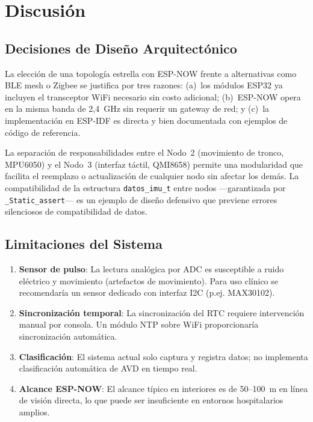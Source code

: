 \documentclass[10pt,twocolumn,a4paper]{article}
\begin{document}
\section{Discusión}
\label{sec:disc}

\subsection{Decisiones de Diseño Arquitectónico}

La elección de una topología estrella con ESP-NOW frente a alternativas
como BLE mesh o Zigbee se justifica por tres razones: (a)~los módulos
ESP32 ya incluyen el transceptor WiFi necesario sin costo adicional;
(b)~ESP-NOW opera en la misma banda de 2,4~GHz sin requerir un gateway
de red; y (c)~la implementación en ESP-IDF es directa y bien documentada
con ejemplos de código de referencia.

La separación de responsabilidades entre el Nodo~2 (movimiento de
tronco, MPU6050) y el Nodo~3 (interfaz táctil, QMI8658) permite una
modularidad que facilita el reemplazo o actualización de cualquier nodo
sin afectar los demás. La compatibilidad de la estructura
\texttt{datos\_imu\_t} entre nodos —garantizada por
\texttt{\_Static\_assert}— es un ejemplo de diseño defensivo que
previene errores silenciosos de compatibilidad de datos.

\subsection{Limitaciones del Sistema}

\begin{enumerate}
  \item \textbf{Sensor de pulso}: La lectura analógica por ADC es
        susceptible a ruido eléctrico y movimiento (artefactos de
        movimiento). Para uso clínico se recomendaría un sensor
        dedicado con interfaz I2C (p.ej. MAX30102).
  \item \textbf{Sincronización temporal}: La sincronización del RTC
        requiere intervención manual por consola. Un módulo NTP sobre
        WiFi proporcionaría sincronización automática.
  \item \textbf{Clasificación}: El sistema actual solo captura y
        registra datos; no implementa clasificación automática de
        AVD en tiempo real.
  \item \textbf{Alcance ESP-NOW}: El alcance típico en interiores es
        de 50--100~m en línea de visión directa, lo que puede
        ser insuficiente en entornos hospitalarios amplios.
\end{enumerate}
\end{document}
